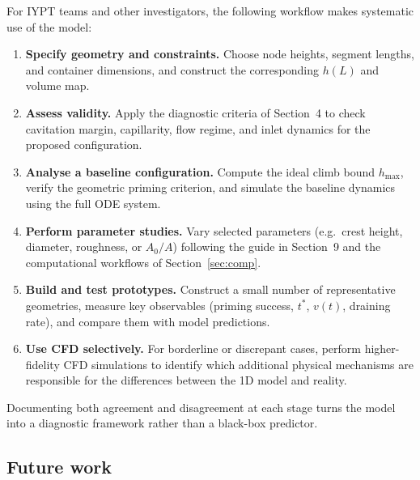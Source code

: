 \documentclass[11pt]{article}
\begin{document}
For IYPT teams and other investigators, the following workflow makes systematic use of the
model:
\begin{enumerate}
  \item \textbf{Specify geometry and constraints.} Choose node heights, segment lengths, and
        container dimensions, and construct the corresponding $h(L)$ and volume map.
  \item \textbf{Assess validity.} Apply the diagnostic criteria of Section~4 to check
        cavitation margin, capillarity, flow regime, and inlet dynamics for the proposed
        configuration.
  \item \textbf{Analyse a baseline configuration.} Compute the ideal climb bound $h_{\max}$,
        verify the geometric priming criterion, and simulate the baseline dynamics using the
        full ODE system.
  \item \textbf{Perform parameter studies.} Vary selected parameters (e.g.\ crest height,
        diameter, roughness, or $A_0/A$) following the guide in Section~9 and the computational
        workflows of Section~\ref{sec:comp}.
  \item \textbf{Build and test prototypes.} Construct a small number of representative
        geometries, measure key observables (priming success, $t^*$, $v(t)$, draining rate),
        and compare them with model predictions.
  \item \textbf{Use CFD selectively.} For borderline or discrepant cases, perform higher-fidelity
        CFD simulations to identify which additional physical mechanisms are responsible for the
        differences between the 1D model and reality.
\end{enumerate}
Documenting both agreement and disagreement at each stage turns the model into a diagnostic
framework rather than a black-box predictor.

\subsection{Future work}
\end{document}
